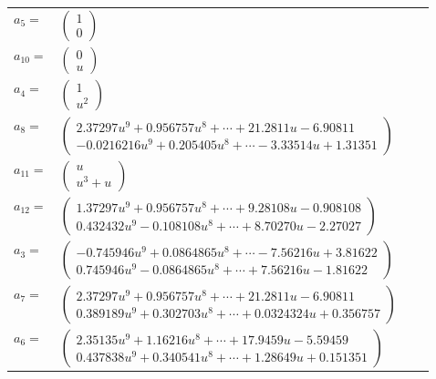 \documentclass[1p]{elsarticle_modified}
\theoremstyle{definition}
\begin{document}
\begin{tabular}{m{7pt} m{180pt} m{7pt} m{180pt} }
\flushright $a_{5}=$&$\begin{pmatrix}1\\0\end{pmatrix}$ \\
\flushright $a_{10}=$&$\begin{pmatrix}0\\u\end{pmatrix}$ \\
\flushright $a_{4}=$&$\begin{pmatrix}1\\u^2\end{pmatrix}$ \\
\flushright $a_{8}=$&$\begin{pmatrix}2.37297 u^{9}+0.956757 u^{8}+\cdots+21.2811 u-6.90811\\-0.0216216 u^{9}+0.205405 u^{8}+\cdots-3.33514 u+1.31351\end{pmatrix}$ \\
\flushright $a_{11}=$&$\begin{pmatrix}u\\u^3+u\end{pmatrix}$ \\
\flushright $a_{12}=$&$\begin{pmatrix}1.37297 u^{9}+0.956757 u^{8}+\cdots+9.28108 u-0.908108\\0.432432 u^{9}-0.108108 u^{8}+\cdots+8.70270 u-2.27027\end{pmatrix}$ \\
\flushright $a_{3}=$&$\begin{pmatrix}-0.745946 u^{9}+0.0864865 u^{8}+\cdots-7.56216 u+3.81622\\0.745946 u^{9}-0.0864865 u^{8}+\cdots+7.56216 u-1.81622\end{pmatrix}$ \\
\flushright $a_{7}=$&$\begin{pmatrix}2.37297 u^{9}+0.956757 u^{8}+\cdots+21.2811 u-6.90811\\0.389189 u^{9}+0.302703 u^{8}+\cdots+0.0324324 u+0.356757\end{pmatrix}$ \\
\flushright $a_{6}=$&$\begin{pmatrix}2.35135 u^{9}+1.16216 u^{8}+\cdots+17.9459 u-5.59459\\0.437838 u^{9}+0.340541 u^{8}+\cdots+1.28649 u+0.151351\end{pmatrix}$ \\

\end{tabular}
\end{document}
